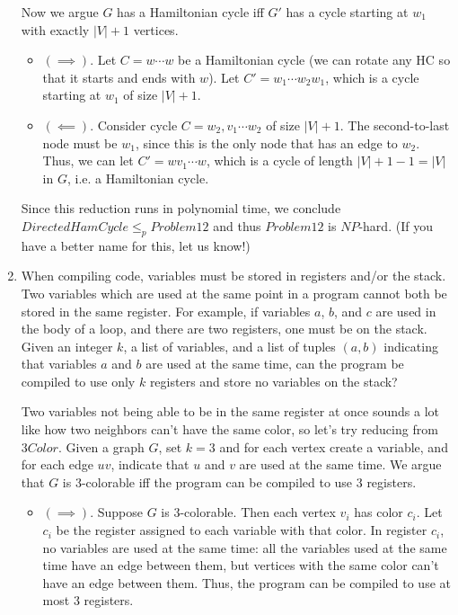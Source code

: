 \documentclass[fleqn]{article}
\begin{document}
\begin{enumerate}
\begin{answer}
        Now we argue $G$ has a Hamiltonian cycle iff $G'$ has a cycle starting at $w_1$ with exactly $|V|+1$ vertices.
        \begin{itemize}
            \item $(\implies)$. Let $C = w\cdots w$ be a Hamiltonian cycle (we can rotate any HC so that it starts and ends with $w$). Let $C' = w_1\cdots w_2 w_1$, which is a cycle starting at $w_1$ of size $|V| + 1$.
            \item $(\impliedby)$. Consider cycle $C = w_2,v_1 \cdots w_2$ of size $|V| + 1$. The second-to-last node must be $w_1$, since this is the only node that has an edge to $w_2$. Thus, we can let $C' = wv_1 \cdots w$, which is a cycle of length $|V| + 1 - 1 = |V|$ in $G$, i.e. a Hamiltonian cycle.
        \end{itemize}
        Since this reduction runs in polynomial time, we conclude $DirectedHamCycle \leq_p Problem12$ and thus $Problem12$ is $NP$-hard. (If you have a better name for this, let us know!)
    \end{answer}
    \item When compiling code, variables must be stored in registers and/or the stack. Two variables which are used at the same point in a program cannot both be stored in the same register. For example, if variables $a$, $b$, and $c$ are used in the body of a loop, and there are two registers, one must be on the stack. Given an integer $k$, a list of variables, and a list of tuples $(a,b)$ indicating that variables $a$ and $b$ are used at the same time, can the program be compiled to use only $k$ registers and store no variables on the stack?
    \begin{answer}
        Two variables not being able to be in the same register at once sounds a lot like how two neighbors can't have the same color, so let's try reducing from $3Color$. Given a graph $G$, set $k=3$ and for each vertex create a variable, and for each edge $uv$, indicate that $u$ and $v$ are used at the same time. We argue that $G$ is 3-colorable iff the program can be compiled to use $3$ registers.
        \begin{itemize}
            \item $(\implies)$. Suppose $G$ is $3$-colorable. Then each vertex $v_i$ has color $c_i$. Let $c_i$ be the register assigned to each variable with that color. In register $c_i$, no variables are used at the same time: all the variables used at the same time have an edge between them, but vertices with the same color can't have an edge between them. Thus, the program can be compiled to use at most $3$ registers.

\end{itemize}
\end{answer}
\end{enumerate}
\end{document}
